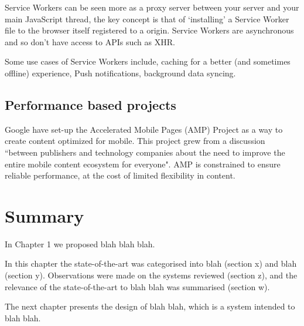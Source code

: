 Service Workers can be seen more as a proxy server between your server and your main JavaScript thread, the key concept is that of `installing' a Service Worker file to the browser itself registered to a origin. Service Workers are asynchronous and so don't have access to APIs such as XHR.

Some use cases of Service Workers include, caching for a better (and sometimes offline) experience, Push notifications, background data syncing. \cite{service_worker}

\subsection{Performance based projects}

Google have set-up the Accelerated Mobile Pages (AMP) Project as a way to create content optimized for mobile. This project grew from a discussion ``between publishers and technology companies about the need to improve the entire mobile content ecosystem for everyone". AMP is constrained to ensure reliable performance, at the cost of limited flexibility in content. \cite{intro_to_amp}

\section{Summary} \label{l-r--summary}

In Chapter 1 we proposed blah blah blah.

In this chapter the state-of-the-art was categorised into blah (section x) and  blah (section y).  Observations were made on the systems reviewed (section z), and the relevance of the state-of-the-art to blah blah was summarised (section w).

The next chapter presents the design of blah blah, which is a system intended to blah blah.
